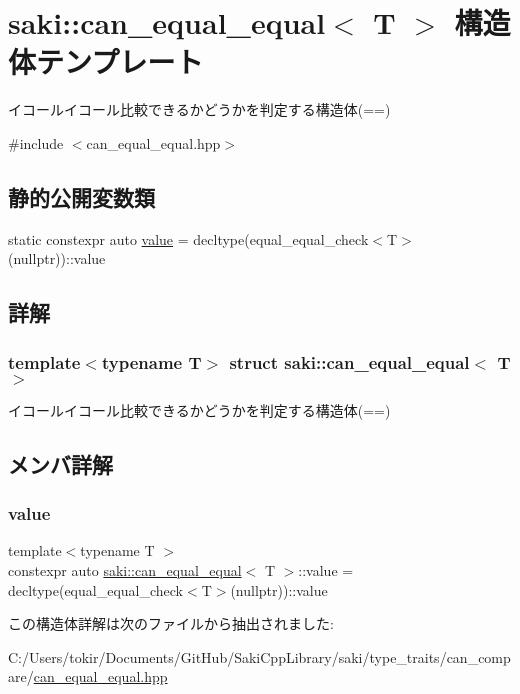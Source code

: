 \hypertarget{structsaki_1_1can__equal__equal}{}\section{saki\+:\+:can\+\_\+equal\+\_\+equal$<$ T $>$ 構造体テンプレート}
\label{structsaki_1_1can__equal__equal}


イコールイコール比較できるかどうかを判定する構造体(==)  




{\ttfamily \#include $<$can\+\_\+equal\+\_\+equal.\+hpp$>$}

\subsection*{静的公開変数類}
\begin{DoxyCompactItemize}
\item 
static constexpr auto \mbox{\hyperlink{structsaki_1_1can__equal__equal_a260408f1ad1896949ac2f75caa272211}{value}} = decltype(equal\+\_\+equal\+\_\+check$<$T$>$(nullptr))\+::value
\end{DoxyCompactItemize}


\subsection{詳解}
\subsubsection*{template$<$typename T$>$\newline
struct saki\+::can\+\_\+equal\+\_\+equal$<$ T $>$}

イコールイコール比較できるかどうかを判定する構造体(==) 

\subsection{メンバ詳解}
\mbox{\label{structsaki_1_1can__equal__equal_a260408f1ad1896949ac2f75caa272211}} 
\subsubsection{\texorpdfstring{value}{value}}
{\footnotesize\ttfamily template$<$typename T $>$ \\
constexpr auto \mbox{\hyperlink{structsaki_1_1can__equal__equal}{saki\+::can\+\_\+equal\+\_\+equal}}$<$ T $>$\+::value = decltype(equal\+\_\+equal\+\_\+check$<$T$>$(nullptr))\+::value\hspace{0.3cm}{\ttfamily [static]}}



この構造体詳解は次のファイルから抽出されました\+:\begin{DoxyCompactItemize}
\item 
C\+:/\+Users/tokir/\+Documents/\+Git\+Hub/\+Saki\+Cpp\+Library/saki/type\+\_\+traits/can\+\_\+compare/\mbox{\hyperlink{can__equal__equal_8hpp}{can\+\_\+equal\+\_\+equal.\+hpp}}\end{DoxyCompactItemize}
